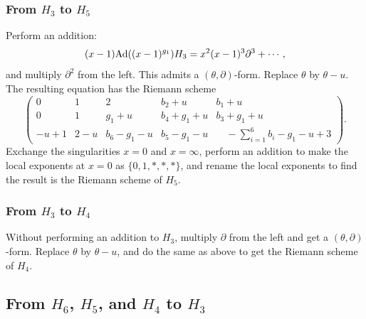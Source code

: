\documentclass[a4paper,12pt]{article}
\theoremstyle{definition}
\theoremstyle{remark}
\numberwithin{equation}{section} %
\begin{document}
\subsubsection{From $H_3$ to $H_5$}\label{fromH3toH5}
Perform an addition:
$$(x-1){\rm Ad}((x-1)^{g_1})H_3=x^2(x-1)^3\partial^3+\cdots,$$
and multiply $\partial^2$ from the left. This admits a $(\theta,\partial)$-form. Replace $\theta$ by $\theta-u$.
The resulting equation has the Riemann scheme
$$\begin{pmatrix}
0& 1& 2& b_2 + u& b_1 + u\\
0& 1& g_1 + u&  b_4+ g_1  + u& b_3 + g_1 + u\\
-u + 1& 2 - u& b_6 - g_1 - u& b_5 - g_1 - u&\quad -\sum_{i=1}^6b_i - g_1 - u + 3
\end{pmatrix}.$$
Exchange the singularities $x=0$ and $x=\infty$, perform an addition to make the local exponents at $x=0$ as $\{0,1,*,*,*\}$, and rename the local exponents to find the result is the Riemann scheme of $H_5$.


  \subsubsection{From $H_3$ to $H_4$}\label{fromH3toH4}
  Without performing an addition to $H_3$, multiply $\partial$ from the left and get a $(\theta,\partial)$-form. Replace $\theta$ by $\theta-u$, and do the same as above to get the Riemann scheme of $H_4$.

  
  \subsection{From $H_6$, $H_5$,  and  $H_4$ to $H_3$}\label{fromH654toH3bymc}
\end{document}
